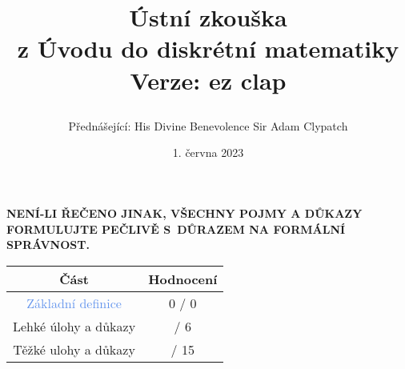 \documentclass[a4paper,11pt]{article}
\title{\Huge\textsf{Ústní zkouška}\\
 \Large\textsf{z Úvodu do diskrétní matematiky}\\
 \vspace*{1em}
 Verze: ez clap\\
 \author{Přednášející: His Divine Benevolence Sir Adam Clypatch}
 \date{1. června 2023}
}
\begin{document}
 \maketitle
 \begin{tcolorbox}[boxsep=3mm,arc=0mm,toprule=1pt,bottomrule=1pt,leftrule=-0.1mm,
   rightrule=-0.1mm,colframe=red!90!black]
  \vspace*{-2pt}
  \begin{center}
   \textbf{NENÍ-LI ŘEČENO JINAK, VŠECHNY POJMY A DŮKAZY FORMULUJTE PEČLIVĚ
   S~DŮRAZEM NA FORMÁLNÍ SPRÁVNOST.}
  \end{center}
 \end{tcolorbox}
 \vspace*{\fill}
 \begin{center}
  \begin{tabular}{c|c}
   \textsf{\textbf{Část}} & \textsf{\textbf{Hodnocení}}\\
   \toprule
   \textcolor{CornflowerBlue}{Základní definice} & 0 / 0\\
   \textcolor{Emerald}{Lehké úlohy a důkazy} & \hspace{2ex}/ 6\\
   \textcolor{BrickRed}{Těžké ulohy a důkazy} & \hspace{2ex} / 15
  \end{tabular}
 \end{center}
 \vspace*{\fill}
 \clearpage
\end{document}
